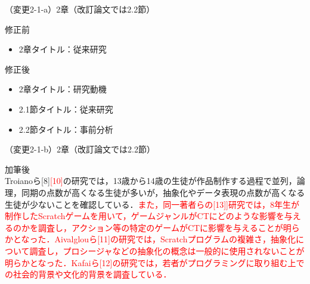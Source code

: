 \documentclass{jarticle} %
\def\subsection#1{ \vspace{1pc} {\gt #1} }
\begin{document}
\subsection{（変更2-1-a）2章（改訂論文では2.2節）}
\vspace{-0.3cm}
\begin{description}
\item 修正前\\
\phantom{　}
\begin{itemize}
\item 2章タイトル：従来研究
\end{itemize}
\vspace{-0.3cm}
\item 修正後\\
\phantom{　}
\begin{itemize}
\item 2章タイトル：研究動機
\item 2.1節タイトル：従来研究
\item 2.2節タイトル：事前分析
\end{itemize}
\end{description}

\subsection{（変更2-1-b）2章（改訂論文では2.2節）}
\vspace{-0.3cm}
\begin{description}
\item 加筆後\\
\phantom{　}
Troianoら[8]\textcolor{red}{[10]}の研究では，13歳から14歳の生徒が作品制作する過程で並列，論理，同期の点数が高くなる生徒が多いが，抽象化やデータ表現の点数が高くなる生徒が少ないことを確認している．\textcolor{red}{また，同一著者らの[13]]研究では，8年生が制作したScratchゲームを用いて，ゲームジャンルがCTにどのような影響を与えるのかを調査し，アクション等の特定のゲームがCTに影響を与えることが明らかとなった．Aivalglouら[11]の研究では，Scratchプログラムの複雑さ，抽象化について調査し，プロシージャなどの抽象化の概念は一般的に使用されないことが明らかとなった．Kafaiら[12]の研究では，若者がプログラミングに取り組む上での社会的背景や文化的背景を調査している．}
\end{description}
\end{document}
